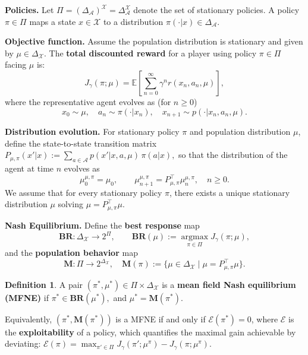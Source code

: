 \documentclass[10pt,twocolumn,letterpaper]{article}
\theoremstyle{definition}
\newtheorem{definition}[theorem]{Definition}
\theoremstyle{remark}
\newcommand{\states}{\mathcal{X}}
\newcommand{\actions}{\mathcal{A}}
\newcommand{\EE}{\mathbb{E}}
\newcommand{\BR}{\mathbf{BR}}
\newcommand{\exploitability}{\mathcal{E}}
\begin{document}
\noindent\textbf{Policies.} Let $\Pi = (\Delta_\actions)^{\states} = \Delta_\actions^{\states}$ denote the set of stationary policies. A policy $\pi \in \Pi$ maps a state $x \in \states$ to a distribution $\pi(\cdot|x) \in \Delta_\actions$.

\noindent\textbf{Objective function.} Assume the population distribution is stationary and given by $\mu \in \Delta_{\states}$. The {\bf total discounted reward} for a player using policy $\pi \in \Pi$ facing $\mu$ is:
\begin{equation}\label{eq: cost_def}
    J_{\gamma}(\pi;\mu) = \EE\left[ \sum_{n=0}^{\infty}\gamma^n r(x_n, a_n, \mu)\right],
\end{equation}
where the representative agent evolves as (for $n\ge 0$)
\begin{equation}\label{eq: dynamics_def}
    x_0 \sim \mu, \quad 
    a_n \sim \pi(\cdot|x_n), \quad 
    x_{n+1} \sim p(\cdot|x_n, a_n, \mu).
\end{equation}

\noindent\textbf{Distribution evolution.} For stationary policy $\pi$ and population distribution $\mu$, define the state-to-state transition matrix
\(
    P_{\mu,\pi}(x'|x) := \sum_{a\in\actions} p(x'|x,a,\mu) \, \pi(a|x),
\)
so that the distribution of the agent at time $n$ evolves as
\[
    \mu_0^{\mu,\pi} = \mu_0, \qquad \mu_{n+1}^{\mu,\pi} = P_{\mu,\pi}^\top \mu_n^{\mu,\pi}, \quad n \ge 0.
\]
We assume that for every stationary policy $\pi$, there exists a unique stationary distribution $\mu$ solving $\mu = P_{\mu,\pi}^\top \mu$.

\noindent\textbf{Nash Equilibrium.} Define the {\bf best response} map
\[
    \BR: \Delta_{\states} \to 2^{\Pi}, \qquad \BR(\mu) := \operatorname*{argmax}_{\pi \in \Pi} J_\gamma(\pi;\mu),
\]
and the {\bf population behavior} map
\begin{equation}\label{eq: population_behaviour_map}
    \mathbf M: \Pi \to 2^{\Delta_{\states}}, \quad 
    \mathbf M(\pi) := \{\mu \in \Delta_{\states} \mid \mu = P_{\mu,\pi}^\top \mu\}.
\end{equation}

\begin{definition}\label{def: NE}
A pair $(\pi^*, \mu^*) \in \Pi \times \Delta_{\states}$ is a {\bf mean field Nash equilibrium (MFNE)} if
$\pi^* \in \BR(\mu^*),$ and $\mu^* = \mathbf M(\pi^*).$
\end{definition}
Equivalently, $(\pi^*, \mathbf M(\pi^*))$ is a MFNE if and only if $\exploitability(\pi^*)=0$, where $\exploitability$ is
the \textbf{exploitability} of a policy, which quantifies the maximal gain achievable by deviating:
$
    \exploitability(\pi) = \max_{\pi' \in \Pi} J_\gamma(\pi'; \mu^\pi) - J_\gamma(\pi; \mu^\pi).
$
\end{document}

